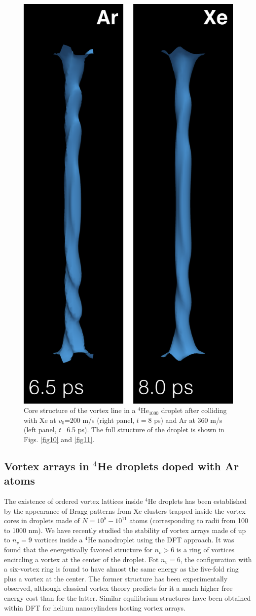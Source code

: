 \begin{figure}[h]
\centerline{\includegraphics[width=0.60\linewidth,clip]{fig12}}
\caption{\label{fig12} 
Core structure of the vortex line in a $^4$He$_{1000}$ droplet after colliding  with  Xe at $v_0$=200 m/s (right panel, $t= 8$ ps) and Ar at 360 m/s (left panel, $t$=6.5 ps). 
The  full structure of the droplet is shown in Figs. \ref{fig10} and \ref{fig11}.
}
\end{figure}
  
\subsection{Vortex arrays in $^4$He droplets doped with Ar atoms}

The existence of ordered vortex lattices inside $^4$He droplets has been established  by the appearance of Bragg patterns from 
Xe clusters trapped inside the vortex cores  in droplets made of $N= 10^8 - 10^{11}$ atoms
(corresponding to radii from 100 to 1000 nm).\cite{Gom14,Jon16}  We have 
recently studied the stability of vortex 
arrays made of up to $n_v=9$ vortices
inside a $^4$He nanodroplet using the DFT approach.\cite{Anc15}  
It was found that 
the energetically favored structure for $n_v > 6$ is a ring 
of vortices encircling a vortex at the center of the droplet.
Fot $n_v=6$,  the 
configuration with a six-vortex ring is found to have almost 
the same energy as the five-fold ring
plus a vortex at the center. The former structure 
has been experimentally observed,\cite{Gom14,Jon16,Ber17} 
although classical vortex theory 
predicts for it a much higher free energy cost than for the latter.\cite{Cam79}
Similar equilibrium structures have been obtained within DFT for
helium nanocylinders hosting vortex arrays.\cite{Anc14}

